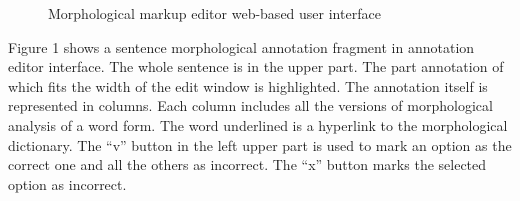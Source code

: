 \documentclass[a4paper]{article}
\begin{document}
\begin{figure}[h!]
\caption{Morphological markup editor web-based user interface}
\end{figure}

Figure 1 shows a sentence morphological annotation fragment in annotation editor interface. The whole sentence is in the upper part. The part annotation of which fits the width of the edit window is highlighted. The annotation itself is represented in columns. Each column includes all the versions of morphological analysis of a word form. The word underlined is a hyperlink to the morphological dictionary. The ``v'' button in the left upper part is used to mark an option as the correct one and all the others as incorrect. The ``x'' button marks the selected option as incorrect.
\end{document}
